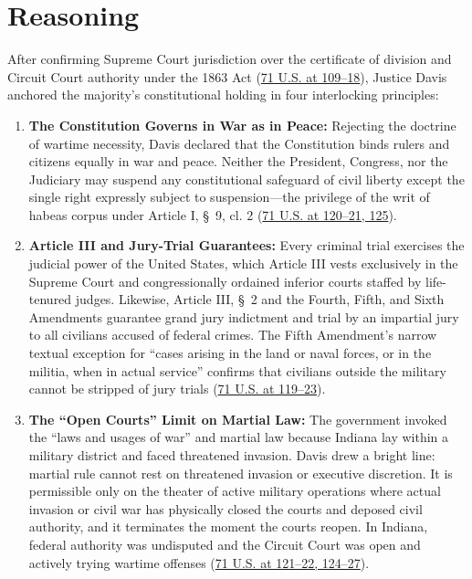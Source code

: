 \documentclass[12pt]{article}
\begin{document}
\section{Reasoning}

After confirming Supreme Court jurisdiction over the certificate of division and Circuit Court authority under the 1863 Act (\href{https://supreme.justia.com/cases/federal/us/71/2/}{71 U.S. at 109--18}), Justice Davis anchored the majority's constitutional holding in four interlocking principles:

\begin{enumerate}
  \item \textbf{The Constitution Governs in War as in Peace:} Rejecting the doctrine of wartime necessity, Davis declared that the Constitution binds rulers and citizens equally in war and peace. Neither the President, Congress, nor the Judiciary may suspend any constitutional safeguard of civil liberty except the single right expressly subject to suspension---the privilege of the writ of habeas corpus under Article I, \S~9, cl. 2 (\href{https://supreme.justia.com/cases/federal/us/71/2/}{71 U.S. at 120--21, 125}).

  \item \textbf{Article III and Jury-Trial Guarantees:} Every criminal trial exercises the judicial power of the United States, which Article III vests exclusively in the Supreme Court and congressionally ordained inferior courts staffed by life-tenured judges. Likewise, Article III, \S~2 and the Fourth, Fifth, and Sixth Amendments guarantee grand jury indictment and trial by an impartial jury to all civilians accused of federal crimes. The Fifth Amendment's narrow textual exception for ``cases arising in the land or naval forces, or in the militia, when in actual service'' confirms that civilians outside the military cannot be stripped of jury trials (\href{https://supreme.justia.com/cases/federal/us/71/2/}{71 U.S. at 119--23}).

  \item \textbf{The ``Open Courts'' Limit on Martial Law:} The government invoked the ``laws and usages of war'' and martial law because Indiana lay within a military district and faced threatened invasion. Davis drew a bright line: martial rule cannot rest on threatened invasion or executive discretion. It is permissible only on the theater of active military operations where actual invasion or civil war has physically closed the courts and deposed civil authority, and it terminates the moment the courts reopen. In Indiana, federal authority was undisputed and the Circuit Court was open and actively trying wartime offenses (\href{https://supreme.justia.com/cases/federal/us/71/2/}{71 U.S. at 121--22, 124--27}).


\end{enumerate}
\end{document}
